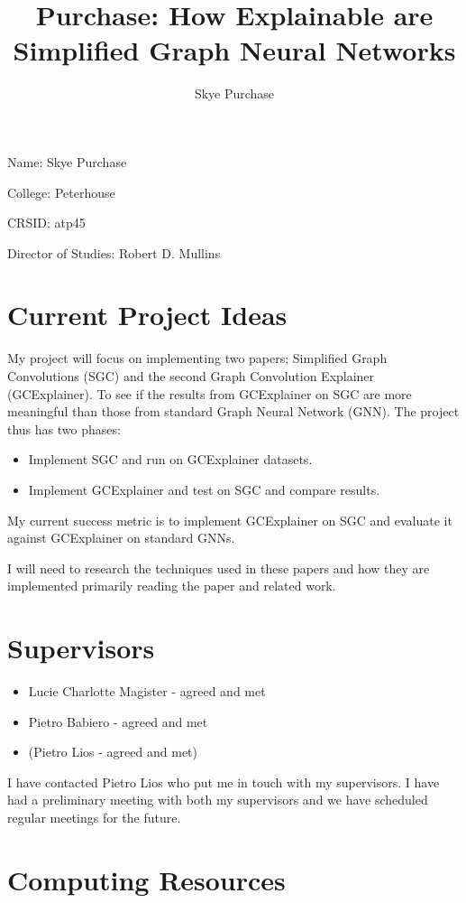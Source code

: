 \documentclass{article}
\title{Purchase: How Explainable are Simplified Graph Neural Networks}
\author{Skye Purchase}
\begin{document}
\maketitle

Name: Skye Purchase 

College: Peterhouse

CRSID: atp45

Director of Studies: Robert D. Mullins

\section{Current Project Ideas}

My project will focus on implementing two papers; Simplified Graph Convolutions (SGC) and the second Graph Convolution Explainer (GCExplainer). To see if the results from GCExplainer on SGC are more meaningful than those from standard Graph Neural Network (GNN). The project thus has two phases:

\begin{itemize}
    \item Implement SGC and run on GCExplainer datasets.
    \item Implement GCExplainer and test on SGC and compare results.
\end{itemize}

My current success metric is to implement GCExplainer on SGC and evaluate it against GCExplainer on standard GNNs.

I will need to research the techniques used in these papers and how they are implemented primarily reading the paper and related work.

\section{Supervisors}

\begin{itemize}
    \item Lucie Charlotte Magister - agreed and met
    \item Pietro Babiero - agreed and met
    \item (Pietro Lios - agreed and met)
\end{itemize}

I have contacted Pietro Lios who put me in touch with my supervisors. I have had a preliminary meeting with both my supervisors and we have scheduled regular meetings for the future.

\section{Computing Resources}
\end{document}

